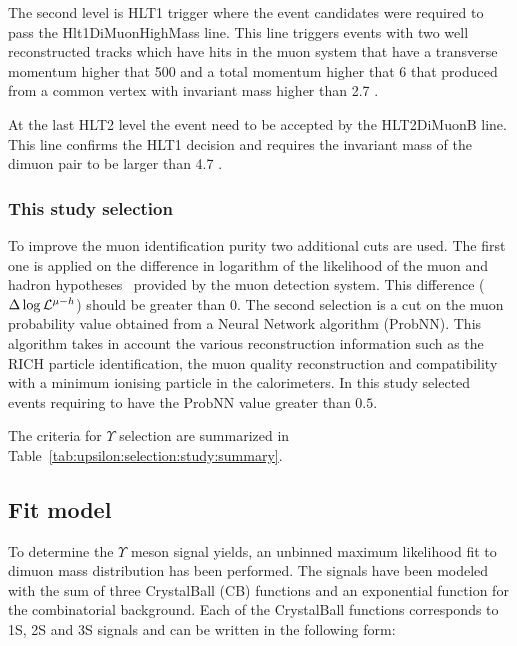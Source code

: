 The second level is HLT1 trigger where the event candidates were required to
pass the Hlt1DiMuonHighMass line.
This line triggers events with  two well reconstructed tracks  which have hits
in the muon system  that have a transverse momentum higher that 500 \mevc and 
a total momentum higher that 6 \gevc that produced from a common vertex with
invariant mass higher than 2.7 \gevcc.

At the last HLT2 level the event need to be accepted by the HLT2DiMuonB line.
This line confirms the HLT1 decision and requires the invariant mass of the
dimuon pair to be larger than 4.7 \gevcc.

\subsubsection{This study selection}
\label{sec:upsilon:selection:study}

To improve the muon identification purity two additional cuts are used. The
first one is applied on the difference in logarithm of the likelihood of the
muon and hadron hypotheses~\cite{Powell} provided by the muon detection system.
This difference ($\Delta\log\mathcal{L}^{\mu-h}$) should be greater than 0. The
second selection  is a cut on the muon probability value obtained from a Neural
Network algorithm (ProbNN). This algorithm takes in account the various
reconstruction information such as the RICH particle identification, the muon
quality reconstruction and compatibility with a minimum ionising particle in the
calorimeters. In this study selected events requiring to have the ProbNN value
greater than $0.5$.

The criteria for  $\Upsilon$ selection are summarized in
Table~\ref{tab:upsilon:selection:study:summary}.



\subsection{Fit model}
\label{sec:upsilon:fit}
To determine the $\Upsilon$ meson signal yields, an unbinned maximum likelihood
fit to dimuon mass distribution has been performed.
The signals have been modeled with the sum of three CrystalBall (CB) functions
and an exponential function for the combinatorial background.
Each of the CrystalBall functions corresponds to \Y1S, \Y2S and \Y3S signals
and can be written in the following form:

